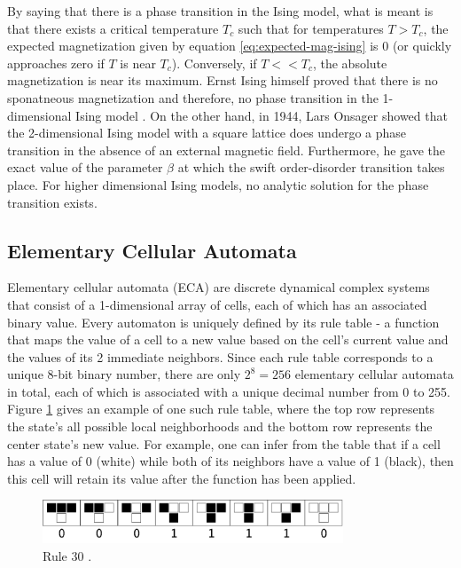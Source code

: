 \documentclass[12pt]{article}
\begin{document}
By saying that there is a phase transition in the Ising model, what is meant is that there exists a critical temperature $T_c$ such that for temperatures $T > T_c$, the expected magnetization given by equation \ref{eq:expected-mag-ising} is 0 (or quickly approaches zero if $T$ is near $T_c$). Conversely, if $T << T_c$, the absolute magnetization is near its maximum. Ernst Ising himself proved that there is no sponatneous magnetization and therefore, no phase transition in the 1-dimensional Ising model \cite{Ising1925}. On the other hand, in 1944, Lars Onsager showed \cite{lars-onsanger} that the 2-dimensional Ising model with a square lattice does undergo a phase transition in the absence of an external magnetic field. Furthermore, he gave the exact value of the parameter $\beta$ at which the swift order-disorder transition takes place. For higher dimensional Ising models, no analytic solution for the phase transition exists. 

\subsection{Elementary Cellular Automata}

Elementary cellular automata (ECA) are discrete dynamical complex systems that consist of a 1-dimensional array of cells, each of which has an associated binary value. Every automaton is uniquely defined by its rule table - a function that maps the value of a cell to a new value based on the cell's current value and the values of its 2 immediate neighbors. Since each rule table corresponds to a unique 8-bit binary number, there are only $2^8 = 256$ elementary cellular automata in total, each of which is associated with a unique decimal number from 0 to 255. Figure \ref{fig:eca-rule-table} gives an example of one such rule table, where the top row represents the state's all possible local neighborhoods and the bottom row represents the center state's new value. For example, one can infer from the table that if a cell has a value of 0 (white) while both of its neighbors have a value of 1 (black), then this cell will retain its value after the function has been applied. 

\begin{figure} [!h]
\begin{center}
\includegraphics[width=0.8\textwidth]{eca-rule-example}
\caption{Rule 30 \cite{weisstein-eca}.}
\label{fig:eca-rule-table}
\end{center}
\end{figure}
\end{document}

